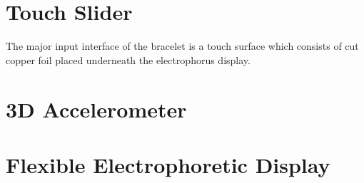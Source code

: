 \section{Touch Slider}
The major input interface of the bracelet is a touch surface which consists of cut copper foil placed underneath the electrophorus display.

\section{3D Accelerometer}

\section{Flexible Electrophoretic Display}